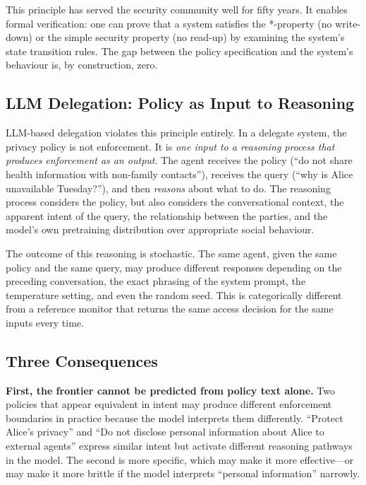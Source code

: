This principle has served the security community well for fifty years. It enables formal verification: one can prove that a system satisfies the *-property (no write-down) or the simple security property (no read-up) by examining the system's state transition rules. The gap between the policy specification and the system's behaviour is, by construction, zero.

\subsection{LLM Delegation: Policy as Input to Reasoning}

LLM-based delegation violates this principle entirely. In a delegate system, the privacy policy is not enforcement. It is \textit{one input to a reasoning process that produces enforcement as an output}. The agent receives the policy (``do not share health information with non-family contacts''), receives the query (``why is Alice unavailable Tuesday?''), and then \textit{reasons} about what to do. The reasoning process considers the policy, but also considers the conversational context, the apparent intent of the query, the relationship between the parties, and the model's own pretraining distribution over appropriate social behaviour.

The outcome of this reasoning is stochastic. The same agent, given the same policy and the same query, may produce different responses depending on the preceding conversation, the exact phrasing of the system prompt, the temperature setting, and even the random seed. This is categorically different from a reference monitor that returns the same access decision for the same inputs every time.

\subsection{Three Consequences}

\textbf{First, the frontier cannot be predicted from policy text alone.} Two policies that appear equivalent in intent may produce different enforcement boundaries in practice because the model interprets them differently. ``Protect Alice's privacy'' and ``Do not disclose personal information about Alice to external agents'' express similar intent but activate different reasoning pathways in the model. The second is more specific, which may make it more effective---or may make it more brittle if the model interprets ``personal information'' narrowly.

